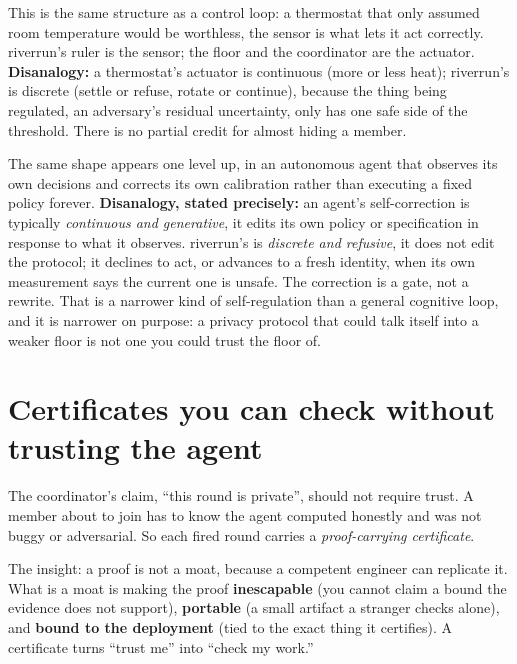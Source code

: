 \documentclass[11pt]{article}
\begin{document}
\begin{intuition}
This is the same structure as a control loop: a thermostat that only assumed room
temperature would be worthless, the sensor is what lets it act correctly. riverrun's ruler
is the sensor; the floor and the coordinator are the actuator. \textbf{Disanalogy:} a
thermostat's actuator is continuous (more or less heat); riverrun's is discrete (settle or
refuse, rotate or continue), because the thing being regulated, an adversary's residual
uncertainty, only has one safe side of the threshold. There is no partial credit for
almost hiding a member.
\end{intuition}

The same shape appears one level up, in an autonomous agent that observes its own
decisions and corrects its own calibration rather than executing a fixed policy forever.
\textbf{Disanalogy, stated precisely:} an agent's self-correction is typically
\emph{continuous and generative}, it edits its own policy or specification in response to
what it observes. riverrun's is \emph{discrete and refusive}, it does not edit the
protocol; it declines to act, or advances to a fresh identity, when its own measurement
says the current one is unsafe. The correction is a gate, not a rewrite. That is a
narrower kind of self-regulation than a general cognitive loop, and it is narrower on
purpose: a privacy protocol that could talk itself into a weaker floor is not one you
could trust the floor of.

\section{Certificates you can check without trusting the agent}
\label{sec:cert}

The coordinator's claim, ``this round is private'', should not require trust. A member
about to join has to know the agent computed honestly and was not buggy or adversarial.
So each fired round carries a \emph{proof-carrying certificate}.

\begin{intuition}
The insight: a proof is not a moat, because a competent engineer can replicate it. What
is a moat is making the proof \textbf{inescapable} (you cannot claim a bound the evidence
does not support), \textbf{portable} (a small artifact a stranger checks alone), and
\textbf{bound to the deployment} (tied to the exact thing it certifies). A certificate
turns ``trust me'' into ``check my work.''
\end{intuition}
\end{document}
